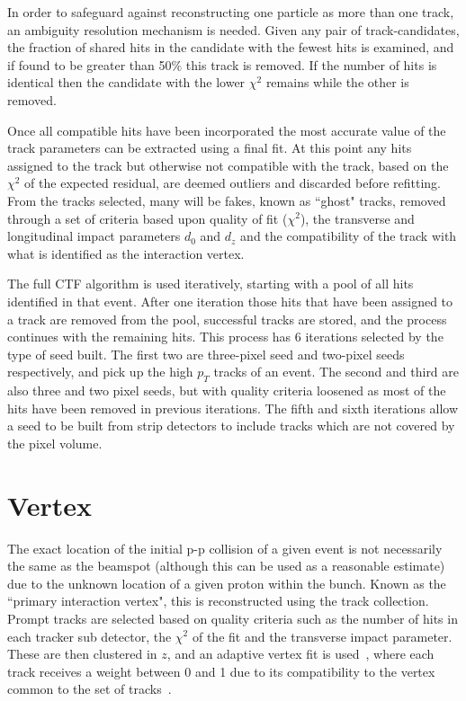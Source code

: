 In order to safeguard against reconstructing one particle as more than one track, an ambiguity resolution mechanism is needed. Given any pair of track-candidates, the fraction of shared hits in the candidate with the fewest hits is examined, and if found to be greater than 50$\%$ this track is removed. If the number of hits is identical then the candidate with the lower $\chi^{2}$ remains while the other is removed. 

Once all compatible hits have been incorporated the most accurate value of the track parameters can be extracted using a final fit. At this point any hits assigned to the track but otherwise not compatible with the track, based on the $\chi^{2}$ of the expected residual, are deemed outliers and discarded before refitting. From the tracks selected, many will be fakes, known as ``ghost" tracks, removed through a set of criteria based upon quality of fit ($\chi^{2}$), the transverse and longitudinal impact parameters $d_{0}$ and $d_{z}$ and the compatibility of the track with what is identified as the interaction vertex. 

The full CTF algorithm is used iteratively, starting with a pool of all hits identified in that event. After one iteration those hits that have been assigned to a track are removed from the pool, successful tracks are stored, and the process continues with the remaining hits. This process has 6 iterations selected by the type of seed built. The first two are three-pixel seed and two-pixel seeds respectively, and pick up the high $p_{T}$ tracks of an event. The second and third are also three and two pixel seeds, but with quality criteria loosened as most of the hits have been removed in previous iterations. The fifth and sixth iterations allow a seed to be built from strip detectors to include tracks which are not covered by the pixel volume.

\section{Vertex}

The exact location of the initial p-p collision of a given event is not necessarily the same as the beamspot (although this can be used as a reasonable estimate) due to the unknown location of a given proton within the bunch. Known as the ``primary interaction vertex", this is reconstructed using the track collection. Prompt tracks are selected based on quality criteria such as the number of hits in each tracker sub detector, the $\chi^{2}$ of the fit and the transverse impact parameter. These are then clustered in $z$, and an adaptive vertex fit is used~\cite{AVF}, where each track receives a weight between 0 and 1 due to its compatibility to the vertex common to the set of tracks~\cite{TRK-10-005}. 


